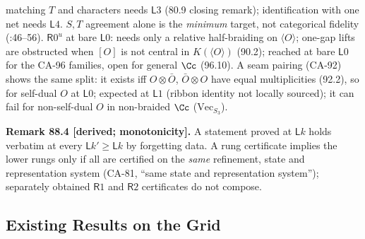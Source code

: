 matching \(T\) and characters needs \(\mathsf L3\) (80.9 closing remark); identification with one net needs \(\mathsf L4\).
\(S,T\) agreement alone is the \emph{minimum} target, not categorical fidelity (:46--56).
\(\mathsf R0^{u}\) at bare \(\mathsf L0\): needs only a relative half-braiding on \(\langle O\rangle\); one-gap lifts are obstructed when
\([O]\) is not central in \(K(\langle O\rangle)\) (90.2); reached at bare \(\mathsf L0\) for the CA-96 families, open for general \(\Cc\) (96.10).  A seam pairing (CA-92) shows
the same split: it exists iff \(O\otimes\bar O\), \(\bar O\otimes O\) have equal multiplicities (92.2), so for self-dual \(O\) at \(\mathsf L0\);
expected at \(\mathsf L1\) (ribbon identity not locally sourced); it can fail for non-self-dual \(O\) in non-braided \(\Cc\) (\(\mathrm{Vec}_{S_3}\)).

\textbf{Remark 88.4 [derived; monotonicity].}  A statement proved at \(\mathsf Lk\) holds verbatim at every
\(\mathsf Lk'\ge\mathsf Lk\) by forgetting data.  A rung certificate implies the lower rungs only if all are certified on
the \emph{same} refinement, state and representation system (CA-81, ``same state and representation system'');
separately obtained \(\mathsf R1\) and \(\mathsf R2\) certificates do not compose.

\subsection{Existing Results on the Grid}

